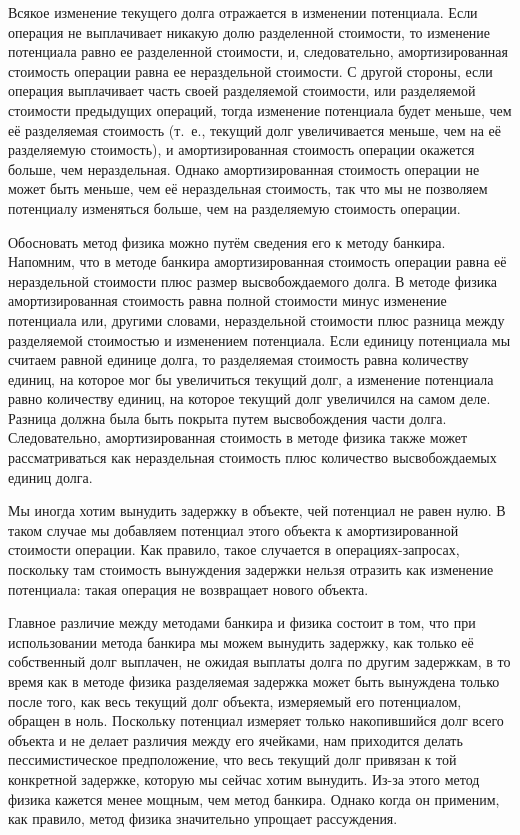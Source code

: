Всякое изменение текущего долга отражается в изменении потенциала.
Если операция не выплачивает никакую долю разделенной стоимости, то
изменение потенциала равно ее разделенной стоимости, и, следовательно,
амортизированная стоимость операции равна ее нераздельной стоимости. С
другой стороны, если операция выплачивает часть своей разделяемой
стоимости, или разделяемой стоимости предыдущих операций, тогда
изменение потенциала будет меньше, чем её разделяемая стоимость
(т.~е., текущий долг увеличивается меньше, чем на её разделяемую
стоимость), и амортизированная стоимость операции окажется больше, чем
нераздельная. Однако амортизированная стоимость операции не может быть
меньше, чем её нераздельная стоимость, так что мы не позволяем
потенциалу изменяться больше, чем на разделяемую стоимость операции.

Обосновать метод физика можно путём сведения его к методу
банкира. Напомним, что в методе банкира амортизированная стоимость
операции равна её нераздельной стоимости плюс размер
высвобождаемого долга. В методе физика амортизированная стоимость
равна полной стоимости минус изменение потенциала или, другими
словами, нераздельной стоимости плюс разница между разделяемой
стоимостью и изменением потенциала.  Если единицу потенциала мы
считаем равной единице долга, то разделяемая стоимость равна
количеству единиц, на которое мог бы увеличиться текущий долг, а
изменение потенциала равно количеству единиц, на которое текущий долг
увеличился на самом деле. Разница должна была быть покрыта путем
высвобождения части долга.  Следовательно, амортизированная стоимость
в методе физика также может рассматриваться как нераздельная стоимость
плюс количество высвобождаемых единиц долга.

Мы иногда хотим вынудить задержку в объекте, чей потенциал не равен
нулю. В таком случае мы добавляем потенциал этого объекта к
амортизированной стоимости операции. Как правило, такое случается в
операциях-запросах, поскольку там стоимость вынуждения задержки нельзя
отразить как изменение потенциала: такая операция не возвращает нового
объекта. 

Главное различие между методами банкира и физика состоит в том, что
при использовании метода банкира мы можем вынудить задержку, как только
её собственный долг выплачен, не ожидая выплаты долга по другим
задержкам, в то время как в методе физика разделяемая задержка может
быть вынуждена только после того, как весь текущий долг объекта,
измеряемый его потенциалом, обращен в ноль.  Поскольку потенциал
измеряет только накопившийся долг всего объекта и не делает различия
между его ячейками, нам приходится делать пессимистическое
предположение, что весь текущий долг привязан к той конкретной
задержке, которую мы сейчас хотим вынудить. Из-за этого метод физика
кажется менее мощным, чем метод банкира. Однако когда он применим, как
правило, метод физика значительно упрощает рассуждения.

